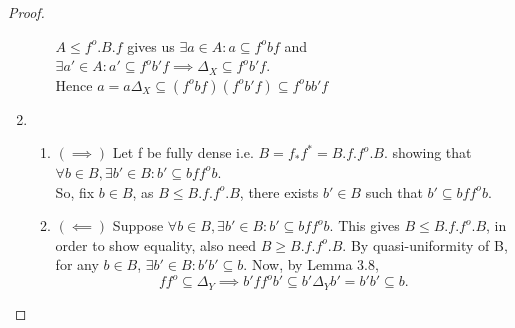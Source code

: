 \documentclass[a4paper]{article}
\theoremstyle{definition}
\begin{document}
\begin{proof}
\begin{enumerate}[label=(\alph*)]
\begin{enumerate}[label=(\roman*)]
							$A\leq f^o .B.f $
							gives us $\exists a \in A : a \subseteq f^o bf$ and
							$\exists a'\in A: a' \subseteq f^o b'f \implies \Delta_X \subseteq
							f^o b'	f$.\\
							Hence $a=a\Delta_X \subseteq (f^o bf) (f^o b'f)
							\subseteq f^o bb'f$
					\end{enumerate}
				\item	\begin{enumerate}[label=(\roman*)]
					\item $(\implies )$ Let f be fully dense i.e. $B=f_*f^* = B.f.f^o.B$.
						showing that $\forall b \in B,\exists b'\in B: b'
						\subseteq bff^ob$.\\
						So, fix $b\in B$, as $B \leq B.f.f^o.B$, there exists $b' \in
						B$ such that $b' \subseteq bff^ob$.
					\item $(\impliedby)$ Suppose $\forall b \in B, \exists b' \in B:
						b' \subseteq bff^ob$. This gives $B\leq B.f.f^o .B$, in order
						to show equality, also need $B\geq B.f.f^o .B$.
						By quasi-uniformity of B, for any $b \in B$, $\exists b'\in B:b'b'
						\subseteq b$. Now, by Lemma 3.8,
						\[ f f^o \subseteq \Delta_Y \implies b'f f^o b' \subseteq b'
						\Delta_Y b'=b'b' \subseteq b.\]


\end{enumerate}
\end{enumerate}
\end{proof}
\end{document}
